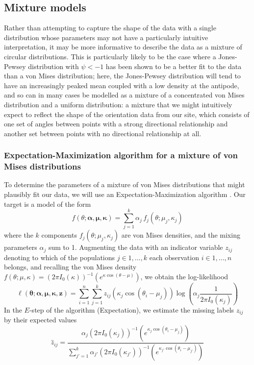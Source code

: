 \documentclass[../../ArchStats.tex]{subfiles}
\begin{document}
\subsection{Mixture models}

Rather than attempting to capture the shape of the data with a single distribution whose parameters may not have a particularly intuitive interpretation, it may be more informative to describe the data as a mixture of circular distributions.  This is particularly likely to be the case where a Jones-Pewsey distribution with  $\psi < -1$ has been shown to be a better fit to the data than a von Mises distribution; here, the Jones-Pewsey distribution will tend to have an increasingly peaked mean coupled with a low density at the antipode, and so can in many cases be modelled as a mixture of a concentrated von Mises distribution and a uniform distribution: a mixture that we might intuitively expect to reflect the shape of the orientation data from our site, which consists of one set of angles between points with a strong directional relationship and another set between points with no directional relationship at all.


\subsubsection{Expectation-Maximization algorithm for a mixture of von Mises distributions}

To determine the parameters of a mixture of von Mises distributions that might plausibly fit our data, we will use an Expectation-Maximization algorithm \cite{Chang-Chien2012}. Our target is a model of the form
\begin{equation}
f(\theta; \boldsymbol{\alpha, \mu, \kappa}) = \sum_{j=1}^k \alpha_j \, f_j(\theta; \mu_j, \kappa_j)
\end{equation}
where the $k$ components $f_j(\theta; \mu_j, \kappa_j)$  are von Mises densities, and the mixing parameters $\alpha_j$ sum to 1. Augmenting the data with an indicator variable $z_{ij}$ denoting to which of the populations $j \in {1, \dots, k}$ each observation $i \in {1, \dots, n}$ belongs, and recalling the von Mises density $f(\theta; \mu, \kappa) = (2\pi I_0(\kappa))^{-1}(e^{\kappa \cos(\theta - \mu)})$, we obtain the log-likelihood
\begin{equation}
\ell(\boldsymbol{\theta}; \boldsymbol{\alpha, \mu, \kappa, z}) = \sum_{i=1}^n \sum_{j=1}
^k z_{ij} \left(\kappa_j \cos(\theta_i - \mu_j)  \right) \log \left( \alpha_j  \frac{1}{2\pi I_0(\kappa_j)} \right)
\end{equation}
In the $E$-step  of the algorithm (Expectation), we estimate the missing labels $z_{ij}$ by their expected values
\begin{equation}
\label{eq:EM-z}
\hat{z}_{ij} = \frac{\alpha_j (2\pi I_0(\kappa_j))^{-1}(e^{\kappa_j \cos(\theta_i - \mu_j)})}{\sum_{j'=1}^k \alpha_{j'} (2\pi I_0(\kappa_{j'}))^{-1}(e^{\kappa_{j'} \cos(\theta_i - \mu_{j'})})} 
\end{equation}
\end{document}
